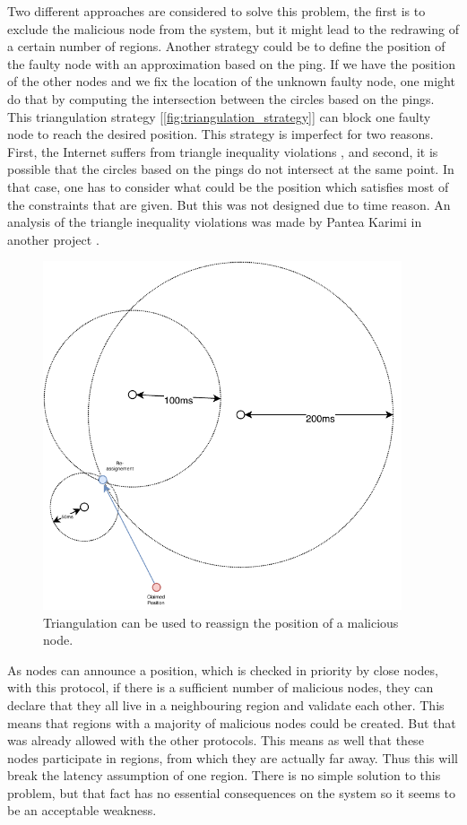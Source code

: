 \documentclass[a4paper,11pt,twoside=semi,openright]{report}
\begin{document}
Two different approaches are considered to solve this problem, the first is to
exclude the malicious node from the system, but it might lead to the redrawing
of a certain number of regions. Another strategy could be to define the
position of the faulty node with an approximation based on the ping. If we have
the position of the other nodes and we fix the location of the unknown faulty
node, one might do that by computing the intersection between the circles based
on the pings. This triangulation strategy
[\autoref{fig:triangulation_strategy}] can block one faulty node to reach the
desired position. This strategy is imperfect for two reasons. First, the
Internet suffers from triangle inequality violations \cite{Lumezanu2009}, and
second, it is possible that the circles based on the pings do not intersect at
the same point. In that case, one has to consider what could be the position
which satisfies most of the constraints that are given. But this was not
designed due to time reason. An analysis of the triangle inequality violations
was made by Pantea Karimi in another project \cite{PanteaKarimi2019}.

\begin{figure}[!h]
\centering
\includegraphics[width=300pt]{figures/triangulation_strategy}
\caption{Triangulation can be used to reassign the position of a malicious
node.}
\label{fig:triangulation_strategy}
\end{figure}

As nodes can announce a position, which is checked in priority by close nodes,
with this protocol, if there is a sufficient number of malicious nodes, they
can declare that they all live in a neighbouring region and validate each
other.  This means that regions with a majority of malicious nodes could be
created. But that was already allowed with the other protocols. This means as
well that these nodes participate in regions, from which they are actually far
away. Thus this will break the latency assumption of one region.  There is no
simple solution to this problem, but that fact has no essential consequences on
the system so it seems to be an acceptable weakness.
\end{document}
